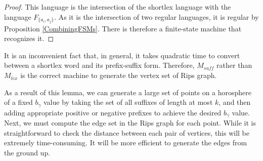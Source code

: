 \documentclass[10pt,a4paper]{amsart}
\theoremstyle{definition}
\theoremstyle{remark}
\begin{document}
	\begin{proof}
		
		This language is the intersection of the shortlex language with the language $F_{\{a_i, a_j\}}$. As it is the intersection of two regular languages, it is regular by Proposition \ref{CombiningFSMs}. There is therefore a finite-state machine that recognizes it. 
               
		
		
		
	\end{proof}
	
	It is an inconvenient fact that, in general, it takes quadratic time to convert between a shortlex word and its prefix-suffix form. Therefore, $M_{suff}$ rather than $M_{lex}$ is the correct machine to generate the vertex set of Rips graph.
	
	As a result of this lemma, we can generate a large set of points on a horosphere of a fixed $b_\gamma$ value by taking the set of all suffixes of length at most $k$, and then adding appropriate positive or negative prefixes to achieve the desired $b_\gamma$ value. Next, we must compute the edge set in the Rips graph for each point. While it is straightforward to check the distance between each pair of vertices, this will be extremely time-consuming. It will be more efficient to generate the edges from the ground up.	
	
\end{document}
